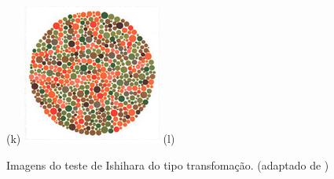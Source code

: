 \documentclass[	12pt, Times, openright, twoside, a4paper, english, brazil]{abntex2}
\begin{document}
\begin{apendicesenv}
\begin{figure}[!htb]
(k)
\endminipage\hfill
{}
\centering
{\includegraphics[width=\linewidth]{ishihara-transformacao/figureIshihara29.png}}
(l)
\endminipage\hfill


\caption{Imagens do teste de Ishihara do tipo transfomação. (adaptado de )}
\label{fig:apendiceTransformacao}

\end{figure}


\end{apendicesenv}
\end{document}
